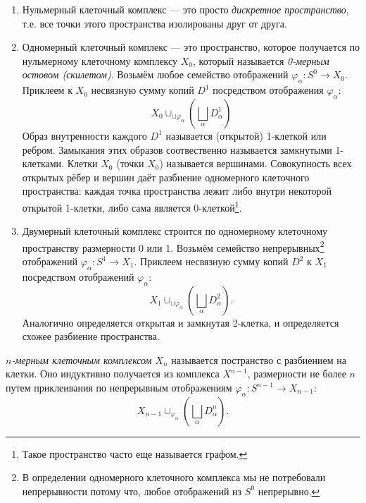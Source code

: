 \documentclass[10pt, twoside]{article}
\begin{document}
\begin{enumerate}
    \item Нульмерный клеточный комплекс --- это просто \emph{дискретное пространство}, т.е. все точки этого пространства изолированы друг от друга. 
    \item Одномерный клеточный комплекс --- это пространство, которое получается по нульмерному клеточному комплексу $X_0$, который называется \emph{0-мерным остовом (скилетом)}. Возьмём любое семейство отображений $\varphi_\alpha \colon S^0 \to X_0$. Приклеем к $X_0$ несвязную сумму копий $D^1$ посредством отображения $\varphi_\alpha$: 
        \[
            X_0 \cup_{\sqcup \varphi_\alpha} \left(\bigsqcup_\alpha D^1_\alpha\right)
        \]
        Образ внутренности каждого $D^1$ называется (открытой) 1-клеткой или ребром. Замыкания этих образов соотвественно называется замкнутыми 1-клетками. Клетки $X_0$ (точки $X_0$) называется вершинами. Совокупность всех открытых рёбер и вершин даёт разбиение одномерного клеточного пространства: каждая точка пространства лежит либо внутри некоторой открытой 1-клетки, либо сама является 0-клеткой\footnote{Такое пространство часто еще называется графом.}.
    \item Двумерный клеточный комплекс строится по одномерному клеточному пространству размерности 0 или 1. Возьмём семейство непрерывных\footnote{В определении одномерного клеточного комплекса мы не потребовали непрерывности потому что, любое отображений из $S^0$ непрерывно.} отображений $\varphi_\alpha\colon S^1 \to X_1.$ Приклеем несвязную сумму копий $D^2$ к $X_1$ посредством отображений $\varphi_\alpha$:
        \[
            X_1 \cup_{\sqcup \varphi_\alpha} \left(\bigsqcup_\alpha D^2_\alpha\right).
        \]
        Аналогично определяется открытая и замкнутая 2-клетка, и определяется схожее разбиение пространства.
\end{enumerate}

\begin{definition}
    \emph{$n$-мерным клеточным комплексом $X_n$} называется постранство с разбиением на клетки. Оно индуктивно получается из  комплекса $X^{n-1}$, размерности не более $n$ путем приклеивания по непрерывным отображениям $\varphi_\alpha \colon S^{n-1} \to X_{n-1}$: \[
        X_{n-1} \cup_{\varphi_\alpha} \left(\bigsqcup_\alpha D_\alpha^n\right).
    \]
\end{definition}
\end{document}

